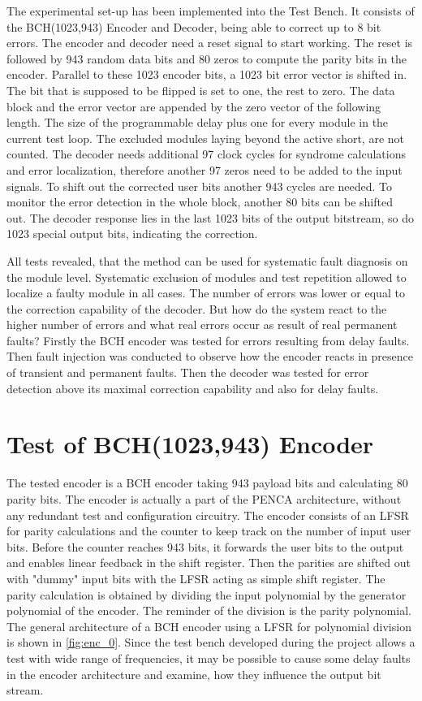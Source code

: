 The experimental set-up has been implemented into the Test Bench. It consists of the BCH(1023,943) Encoder and Decoder, being able to correct up to 8 bit errors. The encoder and decoder need a reset signal to start working. The reset is followed by 943 random data bits and 80 zeros to compute the parity bits in the encoder. Parallel to these 1023 encoder bits, a 1023 bit error vector is shifted in. The bit that is supposed to be flipped is set to one, the rest to zero. The data block and the error vector are appended by the zero vector of the following length. The size of the programmable delay plus one for every module in the current test loop. The excluded modules laying beyond the active short, are not counted. The decoder needs additional 97 clock cycles for syndrome calculations and error localization, therefore another 97 zeros need to be added to the input signals. To shift out the corrected user bits another 943 cycles are needed. To monitor the error detection in the whole block, another 80 bits can be shifted out. The decoder response lies in the last 1023 bits of the output bitstream, so do 1023 special output bits, indicating the correction.

All tests revealed, that the method can be used for systematic fault diagnosis on the module level. Systematic exclusion of modules and test repetition allowed to localize a faulty module in all cases. The number of errors was lower or equal to the correction capability of the decoder. But how do the system react to the higher number of errors and what real errors occur as result of real permanent faults? Firstly the BCH encoder was tested for errors resulting from delay faults. Then fault injection was conducted to observe how the encoder reacts in presence of transient and permanent faults. Then the decoder was tested for error detection above its maximal correction capability and also for delay faults.

\section{Test of BCH(1023,943) Encoder}
The tested encoder is a BCH encoder taking 943 payload bits and calculating 80 parity bits. The encoder is actually a part of the PENCA architecture, without any redundant test and configuration circuitry. The encoder consists of an LFSR for parity calculations and the counter to keep track on the number of input user bits. Before the counter reaches 943 bits, it forwards the user bits to the output and enables linear feedback in the shift register. Then the parities are shifted out with "dummy" input bits with the LFSR acting as simple shift register. The parity calculation is obtained by dividing the input polynomial by the generator polynomial of the encoder. The reminder of the division is the parity polynomial. The general architecture of a BCH encoder using a LFSR for polynomial division is shown in \autoref{fig:enc_0}. Since the test bench developed during the project allows a test with wide range of frequencies, it may be possible to cause some delay faults in the encoder architecture and examine, how they influence the output bit stream.

